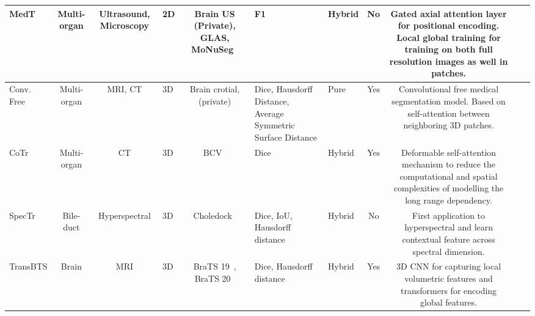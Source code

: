 \begin{table}[]
{\begin{adjustbox}{max width=1.2\textwidth}
\begin{tabular}{V{3}c|c|p{2.2cm}|c|p{3.5cm}|p{3cm}|c|c|p{11.5cm}V{3}}
MedT\cite{zhang2021pyramid}            &     Multi-organ           & Ultrasound, Microscopy   & 2D            & Brain US (Private), GLAS\cite{sirinukunwattana2017gland}, MoNuSeg~\cite{kumar2017dataset}                                                     & F1                                                             &        Hybrid               &    No  & Gated axial attention layer for positional encoding. Local global training for training on both full resolution images as well in patches.                                                                        \\ \hline
Conv. Free\cite{karimi2021convolution}      &      Multi-organ          & MRI, CT                  & 3D            & Brain crotial, (private)                                               &                                         Dice, Hausdorff Distance, Average Symmetric Surface Distance                  &          Pure             &   Yes   & Convolutional free medical segmentation model. Based on self-attention between neighboring 3D patches.                                                                                                                                                          \\ \hline
CoTr\cite{xie2021cotr}            &      Multi-organ          & CT                       & 3D            & BCV~\cite{simpson2019large}                                                                       &                                                  Dice           &          Hybrid            &   Yes    &  Deformable self-attention mechanism to reduce the computational and spatial complexities of modelling the long range dependency.                                                                                                                                                                    \\ \hline
SpecTr\cite{yun2021spectr}          &      Bile-duct          & Hyperspectral                      & 3D            & Choledock~\cite{zhang2019multidimensional} &                                              Dice, IoU, Hausdorff distance                &           Hybrid            &   No   & First application to hyperspectral and learn contextual feature across spectral dimension.                                                                                                              \\ \hline
TransBTS\cite{wang2021transbts}        &        Brain        & MRI                      & 3D            & BraTS 19~\cite{brats19}, BraTS 20~\cite{brats20}                                                          &        Dice, Hausdorff distance                                                      &           Hybrid            &   Yes   & 3D CNN for capturing local volumetric features and transformers for encoding global features.                                                                                                                    \\ \hline

\end{tabular}
\end{adjustbox}}
\end{table}

